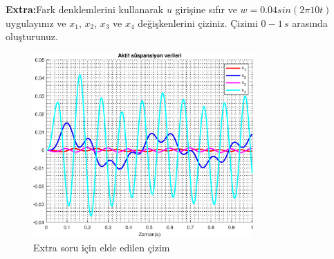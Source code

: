 \noindent\textbf{Extra:}Fark denklemlerini kullanarak $u$ girişine sıfır ve $w=0.04sin(2\pi10t)$ uygulayınız ve $x_1$, $x_2$, $x_3$ ve $x_4$ değişkenlerini çiziniz. Çizimi $0-1\,s$ arasında oluşturunuz. 
\begin{figure}[!htb]
    \centering
    \includegraphics[width=0.75\textwidth]{plot1}
    \caption{Extra soru için elde edilen çizim}
    \label{fig:plot1}
\end{figure}